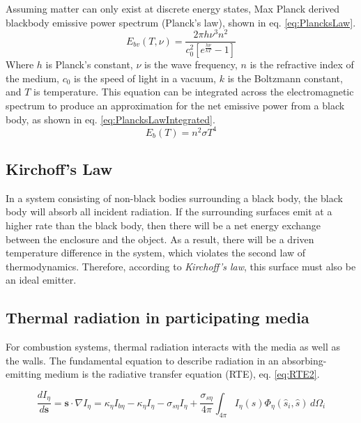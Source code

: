 Assuming matter can only exist at discrete energy states, Max Planck derived blackbody emissive power spectrum (Planck's law), shown in eq. \ref{eq:PlancksLaw}.
\begin{equation}
    E_{bv}(T,\nu{}) = \frac{2\pi{}h\nu{}^3n^2}{c_0^2\left[e^\frac{h\nu{}}{kT}-1\right]}
    \label{eq:PlancksLaw}
\end{equation}
Where $h$ is Planck's constant, $\nu{}$ is the wave frequency, $n$ is the refractive index of the medium, $c_0$ is the speed of light in a vacuum, $k$ is the Boltzmann constant, and $T$ is temperature. This equation can be integrated across the electromagnetic spectrum to produce an approximation for the net emissive power from a black body, as shown in eq. \ref{eq:PlancksLawIntegrated}.
\begin{equation}
    E_b(T) = n^2\sigma{}T^4
    \label{eq:PlancksLawIntegrated}
\end{equation}

\subsection{Kirchoff's Law}
In a system consisting of non-black bodies surrounding a black body, the black body will absorb all incident radiation.
If the surrounding surfaces emit at a higher rate than the black body, then there will be a net energy exchange between the enclosure and the object.
As a result, there will be a driven temperature difference in the system, which violates the second law of thermodynamics.
Therefore, according to \textit{Kirchoff's law}, this surface must also be an ideal emitter.


\subsection{Thermal radiation in participating media}
For combustion systems, thermal radiation interacts with the media as well as the walls. The fundamental equation to describe radiation in an absorbing-emitting medium is the radiative transfer equation (RTE), eq. \ref{eq:RTE2}.

\begin{equation}
    \frac{dI_\eta{}}{d\textbf{s}} = \textbf{s} \cdot \nabla{I_\eta{}} = \kappa{}_\eta{}I_{b\eta{}}-\kappa{}_\eta{}I_\eta{}-\sigma{}_{s\eta{}}I_\eta{}+\frac{\sigma{}_{s\eta{}}}{4\pi}\int_{4\pi{}}{I_\eta{}(\hat{s})\Phi_\eta{}(\hat{s}_i,\hat{s})}\,d\Omega{}_i
    \label{eq:RTE2}
\end{equation}

